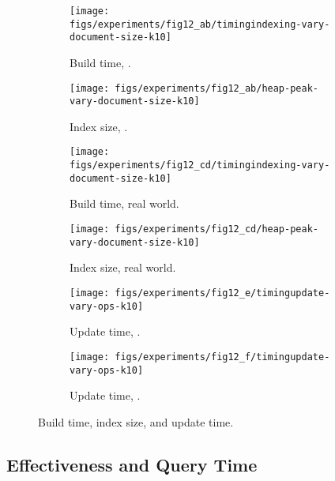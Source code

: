 \begin{figure}[h]
  \begin{subfigure}[b]{0.225\textwidth}
    \centering
    \texttt{[image: figs/experiments/fig12\_ab/timingindexing-vary-document-size-k10]}
    \caption{Build time, \xmark.}
    \label{fig:struct-cone-slim-timingindexing-vary-document-size-k10}
  \end{subfigure}
  \quad
  \begin{subfigure}[b]{0.225\textwidth}
    \centering
    \texttt{[image: figs/experiments/fig12\_ab/heap-peak-vary-document-size-k10]}
    \caption{Index size, \xmark.}
    \label{fig:struct-cone-slim-heap-peak-vary-document-size-k10}
  \end{subfigure}
  \quad
  \begin{subfigure}[b]{0.225\textwidth}
    \centering
    \texttt{[image: figs/experiments/fig12\_cd/timingindexing-vary-document-size-k10]}
    \caption{Build time, real world.}
    \label{fig:struct-cone-slim-timingindexing-vary-document-size-k10-large}
  \end{subfigure}
  \quad
  \begin{subfigure}[b]{0.225\textwidth}
    \centering
    \texttt{[image: figs/experiments/fig12\_cd/heap-peak-vary-document-size-k10]}
    \caption{Index size, real world.}
    \label{fig:struct-cone-slim-heap-peak-vary-document-size-k10-large}
  \end{subfigure}
  \begin{subfigure}[b]{0.225\textwidth}
    \centering
    \texttt{[image: figs/experiments/fig12\_e/timingupdate-vary-ops-k10]}
    \caption{Update time, .}
    \label{fig:slim-timingupdate-vary-ops-k10-synthetic}
  \end{subfigure}
  \quad
  \begin{subfigure}[b]{0.225\textwidth}
    \centering
    \texttt{[image: figs/experiments/fig12\_f/timingupdate-vary-ops-k10]}
    \caption{Update time, \dblp.}
    \label{fig:slim-timingupdate-vary-ops-k10-realworld}
  \end{subfigure}
  \caption{Build time, index size, and update time.} %
  \label{fig:struct-cone-slim-timingindexing-heap-peak-vary-document-size-k10}
\end{figure}

\subsection{Effectiveness and Query Time}
\label{subsec:empirical-evaluation-querying-and-verifications}

